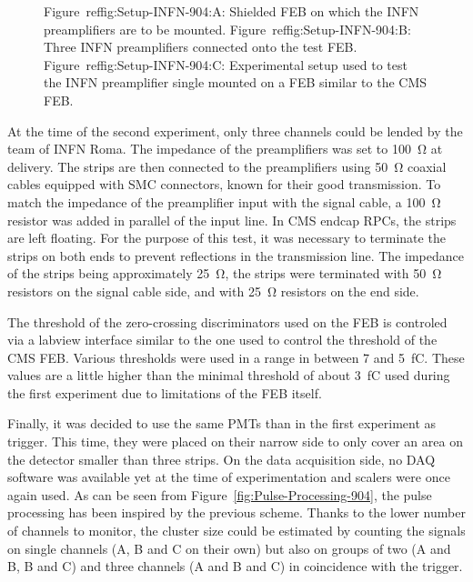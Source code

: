 \begin{figure}[H]
\begin{subfigure}{\linewidth}
			\caption{\label{fig:Setup-INFN-904:C}}
		\end{subfigure}
		\caption{\label{fig:Setup-INFN-904} Figure~ref{fig:Setup-INFN-904:A}: Shielded \acl{FEB} on which the INFN preamplifiers are to be mounted. Figure~ref{fig:Setup-INFN-904:B}: Three INFN preamplifiers connected onto the test FEB. Figure~ref{fig:Setup-INFN-904:C}: Experimental setup used to test the INFN preamplifier single mounted on a FEB similar to the CMS FEB.}
    \end{figure}
	
	At the time of the second experiment, only three channels could be lended by the team of INFN Roma. The impedance of the preamplifiers was set to \SI{100}{\ohm} at delivery. The strips are then connected to the preamplifiers using \SI{50}{\ohm} coaxial cables equipped with SMC connectors, known for their good transmission. To match the impedance of the preamplifier input with the signal cable, a \SI{100}{\ohm} resistor was added in parallel of the input line. In CMS endcap RPCs, the strips are left floating. For the purpose of this test, it was necessary to terminate the strips on both ends to prevent reflections in the transmission line. The impedance of the strips being approximately \SI{25}{\ohm}, the strips were terminated with \SI{50}{\ohm} resistors on the signal cable side, and with \SI{25}{\ohm} resistors on the end side.
	
	The threshold of the zero-crossing discriminators used on the FEB is controled via a labview interface similar to the one used to control the threshold of the CMS FEB. Various thresholds were used in a range in between 7 and \SI{5}{fC}. These values are a little higher than the minimal threshold of about \SI{3}{fC} used during the first experiment due to limitations of the FEB itself.
	
	Finally, it was decided to use the same PMTs than in the first experiment as trigger. This time, they were placed on their narrow side to only cover an area on the detector smaller than three strips. On the data acquisition side, no DAQ software was available yet at the time of experimentation and scalers were once again used. As can be seen from Figure~\ref{fig:Pulse-Processing-904}, the pulse processing has been inspired by the previous scheme. Thanks to the lower number of channels to monitor, the cluster size could be estimated by counting the signals on single channels (A, B and C on their own) but also on groups of two (A and B, B and C) and three channels (A and B and C) in coincidence with the trigger.
	
